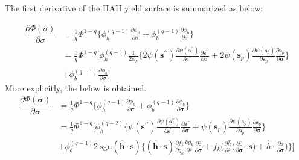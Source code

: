 \documentclass[12pt]{amsart}
\begin{document}
The first derivative of the HAH yield surface is summarized as below:

\begin{equation}
  \label{eq:hah_yieldsurface_derivative}
  \begin{split}
    \dfrac{\partial\Phi(\sigma)}{\partial\sigma}&=\frac{1}{q}\Phi^{1-q}\bigg\{\phi_h^{(q-1)}\frac{\partial\phi_h}{\partial\sigma} + \phi_b^{(q-1)}\frac{\partial\phi_b}{\partial\sigma}\bigg\}\\
    &=\frac{1}{q}\Phi^{1-q}\bigg[\phi_h^{(q-1)}\frac{1}{2\phi_h}\bigg\{ 2\psi(\mathbf{s}^{\prime\prime})\frac{\partial{\psi(\mathbf{s}^{\prime\prime})}}{\partial{\mathbf{s}^{\prime\prime}}}  \frac{\partial\mathbf{s}^{\prime\prime}}{\partial \mathbf{\sigma}}+ 2\psi(\mathbf{s}_p) \frac{\partial{\psi(\mathbf{s}_p)}}{\partial{\mathbf{s}_p}} \frac{\partial{\mathbf{s}_p}}{\partial{\mathbf{\sigma}}}\bigg\} \\
    &+ \phi_b^{(q-1)}\frac{\partial\phi_b}{\partial\sigma}\bigg]
  \end{split}
\end{equation}
More explicitly, the below is obtained.
\begin{equation}
  \label{eq:hah_yieldsurface_derivative_aux}
  \begin{split}
    \dfrac{\partial\Phi(\mathbf{\sigma})}{\partial\mathbf{\sigma}}&=\frac{1}{q}\Phi^{1-q}\bigg\{\phi_h^{(q-1)}\frac{\partial\phi_h}{\partial\mathbf{\sigma}}+\phi_b^{(q-1)}\frac{\partial\phi_b}{\partial\mathbf{\sigma}}\bigg\}\\
    &=\frac{1}{q}\Phi^{1-q}\bigg[\phi_h^{(q-2)}\bigg\{\psi(\mathbf{s}^{\prime\prime})\frac{\partial{\psi(\mathbf{s}^{\prime\prime})}}{\partial{\mathbf{s}^{\prime\prime}}}\frac{\partial\mathbf{s}^{\prime\prime}}{\partial \mathbf{\sigma}}+\psi(\mathbf{s}_p)\frac{\partial{\psi(\mathbf{s}_p)}}{\partial{\mathbf{s}_p}}\frac{\partial{\mathbf{s}_p}}{\partial{\mathbf{\sigma}}}\bigg\}\\
    &+\phi_b^{(q-1)}2\ \text{sgn}(\hat{\mathbf{h}}\cdot\mathbf{s})\bigg\{(\hat{\mathbf{h}}\cdot\mathbf{s})
    \frac{\partial f_k}{\partial g_k} \frac{\partial g_k}{\partial\bar{\varepsilon}}
    \frac{\partial\bar{\varepsilon}}{\partial\mathbf{\sigma}}+f_k\Bigg(\frac{\partial\hat{h}}{\partial\bar{\varepsilon}}\bigg(\frac{\partial\bar{\varepsilon}}{\partial\mathbf{\sigma}}\cdot\mathbf{s}\bigg)+\hat{h}\cdot\frac{\partial\mathbf{s}}{\partial \mathbf{\sigma}}
      \Bigg)\bigg\} \bigg]
  \end{split}
\end{equation}
\end{document}
